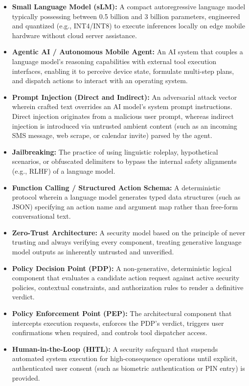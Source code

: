 \begin{itemize}
    \item \textbf{Small Language Model (sLM):} A compact autoregressive language model typically possessing between 0.5 billion and 3 billion parameters, engineered and quantized (e.g., INT4/INT8) to execute inferences locally on edge mobile hardware without cloud server assistance.
    \item \textbf{Agentic AI / Autonomous Mobile Agent:} An AI system that couples a language model's reasoning capabilities with external tool execution interfaces, enabling it to perceive device state, formulate multi-step plans, and dispatch actions to interact with an operating system.
    \item \textbf{Prompt Injection (Direct and Indirect):} An adversarial attack vector wherein crafted text overrides an AI model's system prompt instructions. Direct injection originates from a malicious user prompt, whereas indirect injection is introduced via untrusted ambient content (such as an incoming SMS message, web scrape, or calendar invite) parsed by the agent.
    \item \textbf{Jailbreaking:} The practice of using linguistic roleplay, hypothetical scenarios, or obfuscated delimiters to bypass the internal safety alignments (e.g., RLHF) of a language model.
    \item \textbf{Function Calling / Structured Action Schema:} A deterministic protocol wherein a language model generates typed data structures (such as JSON) specifying an action name and argument map rather than free-form conversational text.
    \item \textbf{Zero-Trust Architecture:} A security model based on the principle of never trusting and always verifying every component, treating generative language model outputs as inherently untrusted and unverified.
    \item \textbf{Policy Decision Point (PDP):} A non-generative, deterministic logical component that evaluates a candidate action request against active security policies, contextual constraints, and authorization rules to render a definitive verdict.
    \item \textbf{Policy Enforcement Point (PEP):} The architectural component that intercepts execution requests, enforces the PDP's verdict, triggers user confirmations when required, and controls tool dispatcher access.
    \item \textbf{Human-in-the-Loop (HITL):} A security safeguard that suspends automated system execution for high-consequence operations until explicit, authenticated user consent (such as biometric authentication or PIN entry) is provided.

\end{itemize}
